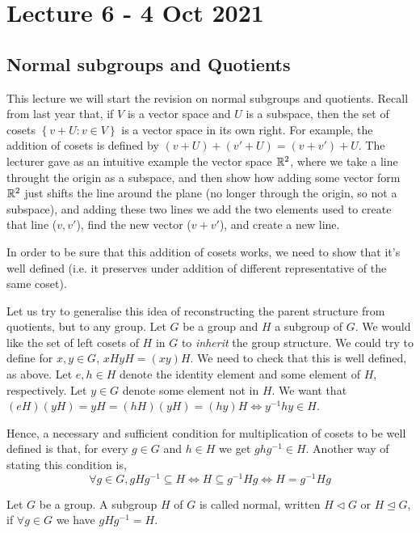\section{Lecture 6 - 4 Oct 2021}
\subsection{Normal subgroups and Quotients}
This lecture we will start the revision on normal subgroups and quotients.
Recall from last year that, if $V$ is a vector space and $U$ is a subspace, then the set
of cosets $\left\{ v+ U: v\in V \right\}$ is a vector space in its own right. For example,
the addition of cosets is defined by $(v+U)+(v'+U)=(v+v')+U$. The lecturer gave as an
intuitive example the vector space $\mathbb R^2$, where we take a line throught the origin as a
subspace, and then show how adding some vector form $\mathbb R^2$ just shifts the line around
the plane (no longer through the origin, so not a subspace), and adding these two lines we
add the two elements used to create that line ($v,v'$), find the new vector ($v+v'$), and
create a new line.

In order to be sure that this addition of cosets works, we need to show that it's well
defined (i.e. it preserves under addition of different representative of the same coset).


Let us try to generalise this idea of reconstructing the parent structure from quotients,
but to any group. Let $G$ be a group and $H$ a subgroup of $G$. We would like the set of
left cosets of $H$ in $G$ to \emph{inherit} the group structure. We could try to define
for $x,y\in G$, $xH yH=(xy)H$. We need to check that this is well defined, as above. Let
$e,h\in H$ denote the identity element and some element of $H$, respectively. Let $y\in G$
denote some element not in $H$. We want that $(eH)(yH)=yH = (hH)(yH)=(hy)H \iff
y^{-1}hy\in H$. 

Hence, a necessary and sufficient condition for multiplication of cosets
to be well defined is that, for every $g\in G$ and $h\in H$ we get $ghg^{-1}\in H$.
Another way of stating this condition is,
\[\forall g\in G, gHg^{-1}\subseteq H \iff H\subseteq g^{-1}H g \iff H=g^{-1}H g\]

\begin{definition}
  Let $G$ be a group. A subgroup $H$ of $G$ is called normal, written $H\triangleleft G$
  or $H\trianglelefteq G$, if $\forall g\in G$ we have $gHg^{-1}=H$.
  \label{normalSubgroup}
\end{definition}

